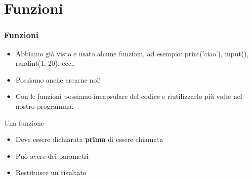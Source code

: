 \section{Funzioni}

\begin{frame}[fragile]
\frametitle{Funzioni}
    \begin{block}{}
        \begin{itemize}
            \item Abbiamo già visto e usato alcune funzioni, ad esempio: print('ciao'), input(), randint(1, 20), ecc..
            \item Possiamo anche crearne noi!
            \item Con le funzioni possiamo incapsulare del codice e riutilizzarlo più volte nel nostro programma.
        \end{itemize}
    \end{block}
    
    \begin{block}{Una funzione}
        \begin{itemize}
            \item Deve essere dichiarata \textbf{prima} di essere chiamata
            \item Può avere dei parametri
            \item Restituisce un risultato
        \end{itemize}
    \end{block}
\end{frame}

